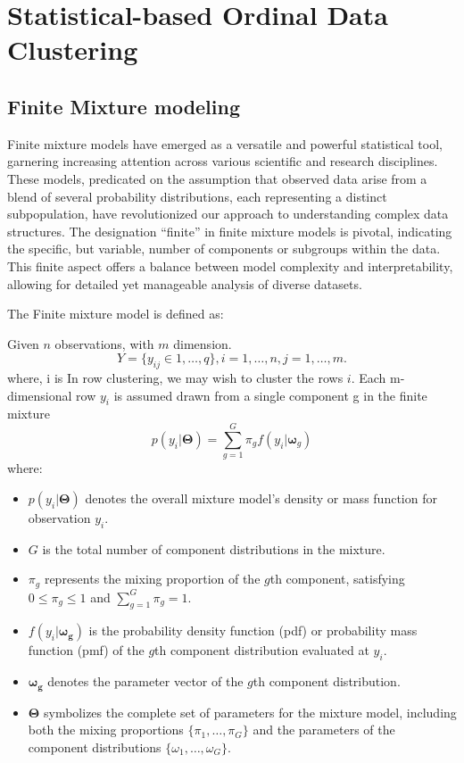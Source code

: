 \documentclass{article}
\begin{document}
\section{Statistical-based Ordinal Data Clustering}

\subsection{Finite Mixture modeling}

Finite mixture models have emerged as a versatile and powerful statistical tool, garnering increasing attention across various scientific and research disciplines. These models, predicated on the assumption that observed data arise from a blend of several probability distributions, each representing a distinct subpopulation, have revolutionized our approach to understanding complex data structures. The designation ``finite'' in finite mixture models is pivotal, indicating the specific, but variable, number of components or subgroups within the data. This finite aspect offers a balance between model complexity and interpretability, allowing for detailed yet manageable analysis of diverse datasets.

The Finite mixture model is defined as:

Given $n$ observations, with $m$ dimension.
\begin{equation}
Y = \{y_{ij} \in {1, \dots, q}\}, 
i = 1, \dots, n, j = 1, \dots, m. 
\end{equation}
where, i is 
In row clustering, we may wish to cluster the rows $i$.
Each m-dimensional row $y_i$ is assumed drawn from a single component g in the finite mixture
\begin{equation}
p(y_i|\mathbf{\Theta}) = \sum_{g=1}^{G} \pi_g f(y_i|\boldsymbol{\omega}_g)
\end{equation}
where:
\begin{itemize}
    \item $p(y_i|\mathbf{\Theta})$ denotes the overall mixture model's density or mass function for observation $y_i$.
    \item $G$ is the total number of component distributions in the mixture.
    \item $\pi_g$ represents the mixing proportion of the $g$th component, satisfying $0 \leq \pi_g \leq 1$ and $\sum_{g=1}^{G} \pi_g = 1$.
    \item $f(y_i|\boldsymbol{\omega_g})$ is the probability density function (pdf) or probability mass function (pmf) of the $g$th component distribution evaluated at $y_i$.
    \item $\boldsymbol{\omega_g}$ denotes the parameter vector of the $g$th component distribution.
    \item $\mathbf{\Theta}$ symbolizes the complete set of parameters for the mixture model, including both the mixing proportions $\{\pi_1, \ldots, \pi_G\}$ and the parameters of the component distributions $\{\omega_1, \ldots, \omega_G\}$.
\end{itemize}
\end{document}
